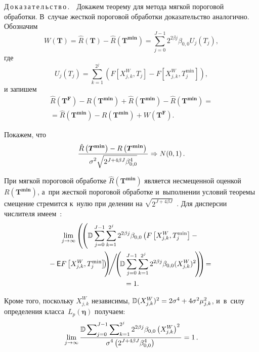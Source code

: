 \begin{multicols}{2}
\noindent
Д\,о\,к\,а\,з\,а\,т\,е\,л\,ь\,с\,т\,в\,о\,.\ \ Докажем теорему для метода мягкой пороговой 
обработки. В~случае жесткой пороговой обработки доказательство аналогично.
Обозначим
\begin{equation*}
  W(\bm{T})=\hat{R}(\bm{T}) -\hat{R}\left(\bm{T}^{\mathbf{min}}\right)=\sum\limits_{j=0}^{J-1}2^{2\beta j} 
\beta_{0,0}  U_j(T_j),
\end{equation*}
где
$$
U_{j}(T_j)= \sum\limits_{k=1}^{2^j} \left(F\left[X_{j,k}^W,T_j\right]-
F\left[X_{j,k}^W,T_j^{\min}\right]\right),
$$
и запишем
\begin{multline*}
  \hat{R}\left(\bm{T^F}\right) -{R}\left(\bm{T^{\min}}\right) + \hat{R}\left(\bm{T^{\min}}\right) - 
\hat{R}\left(\bm{T^{\min}}\right) ={}\\
{}= \hat{R}\left(\bm{T^{\min}}\right) - {R}\left(\bm{T^{\min}}\right) + W\left(\bm{T^F}\right).
\end{multline*}

Покажем, что
\begin{equation}
\label{Rm_norm}
  \displaystyle\frac{\displaystyle \hat{R}\left(\bm{T^{\min}}\right) - {R}\left(\bm{T^{\min}}\right)\mathstrut}{\displaystyle \sigma^2\sqrt{2^{J+4\beta J} 
\beta_{0,0}^4}\mathstrut} \Rightarrow N(0,1)\,.
\end{equation}

При мягкой пороговой обработке $\hat{R}(\bm{T^{\min}})$ является несмещенной 
оценкой ${R}(\bm{T^{\min}})$, а~при жесткой пороговой обработке и~выполнении 
условий теоремы смещение стремится к~нулю при делении на $\sqrt{2^{J+4\beta J}}$~\cite{Mallat}. 
Для дисперсии числителя имеем~\cite{M09}:
\begin{multline}
\label{Var_Lim1}
\lim\limits_{j\to\infty}
\left(\!\left( \mathbb{D}\sum\limits_{j=0}^{J-1}
\sum\limits_{k=1}^{2^j}2^{2\beta j}\beta_{0,0}
\left(F\left[X_{j,k}^W,T_j^{\min}\right]-{}\right.\right.\right.\\
\hspace*{-7pt}\left.\left.\left.{}-
{\sf E} F\left[X_{j,k}^W,T_j^{\min}\right]\!
\right)\!\!\!
\vphantom{\sum\limits_{k=1}^{2^j}}
\right)\!\!\!\Bigg/\!\!\!
\left(\!{\mathbb{D}\sum\limits_{j=0}^{J-1}
\sum\limits_{k=1}^{2^j}2^{2\beta j}\beta_{0,0}(X_{j,k}^W)^2}\!\right)\!\!\right)\!={}\hspace*{-0.89912pt}\\
{}=1.
\end{multline}

Кроме того, поскольку $X_{j,k}^W$ независимы, $\mathbb{D} 
(X_{j,k}^W)^2\hm=2\sigma^4\hm+4\sigma^2 \mu^2_{j,k}$, и~в~силу определения класса~$L_p(\bm{\eta})$ 
получаем:
\begin{equation}
\label{Var_Lim2}
\lim\limits_{j\to\infty}\displaystyle\frac{\displaystyle \mathbb{D}\sum\nolimits_{j=0}^{J-1}
\sum\nolimits_{k=1}^{2^j}2^{2\beta j}\beta_{0,0}\left(X_{j,k}^W\right)^2\mathstrut}{\displaystyle \sigma^4 
\left({2^{J+4\beta J} \beta_{0,0}^4}\right)\mathstrut}=1\,.
\end{equation}


\end{multicols}
